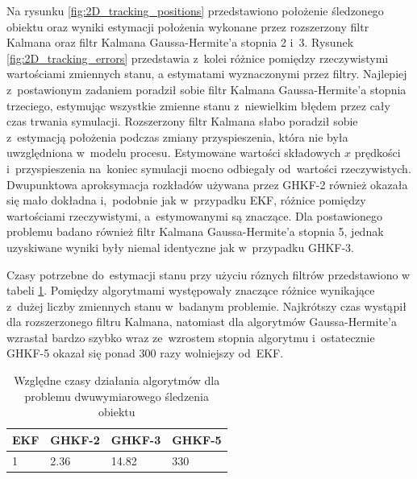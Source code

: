 Na rysunku \ref{fig:2D_tracking_positions} przedstawiono położenie śledzonego obiektu oraz wyniki estymacji położenia wykonane przez rozszerzony filtr Kalmana oraz filtr Kalmana Gaussa-Hermite'a stopnia 2 i~3. Rysunek \ref{fig:2D_tracking_errors} przedstawia z~kolei różnice pomiędzy rzeczywistymi wartościami zmiennych stanu, a estymatami wyznaczonymi przez filtry. Najlepiej z~postawionym zadaniem poradził sobie filtr Kalmana Gaussa-Hermite'a stopnia trzeciego, estymując wszystkie zmienne stanu z~niewielkim błędem przez cały czas trwania symulacji. Rozszerzony filtr Kalmana słabo poradził sobie z~estymacją położenia podczas zmiany przyspieszenia, która nie była uwzględniona w~modelu procesu. Estymowane wartości składowych $x$ prędkości i~przyspieszenia na~koniec symulacji mocno odbiegały od~wartości rzeczywistych. Dwupunktowa aproksymacja rozkładów używana przez GHKF-2 również okazała się mało dokładna i,~podobnie jak w~przypadku EKF, różnice pomiędzy wartościami rzeczywistymi, a~estymowanymi są znaczące. Dla postawionego problemu badano również filtr Kalmana Gaussa-Hermite'a stopnia 5, jednak uzyskiwane wyniki były niemal identyczne jak w~przypadku GHKF-3. \par
Czasy potrzebne do~estymacji stanu przy użyciu róznych filtrów przedstawiono w tabeli \ref{tab:2D_tracking_times}. Pomiędzy algorytmami występowały znaczące różnice wynikające z~dużej liczby zmiennych stanu w~badanym problemie. Najkrótszy czas wystąpił dla rozszerzonego filtru Kalmana, natomiast dla algorytmów Gaussa-Hermite'a wzrastał bardzo szybko wraz ze~wzrostem stopnia algorytmu i~ostatecznie GHKF-5 okazał się ponad 300 razy wolniejszy od~EKF. 
\begin{table}[]
	\caption{Względne czasy działania algorytmów dla problemu dwuwymiarowego śledzenia obiektu}
	\label{tab:2D_tracking_times}
	\begin{center}
		\begin{tabular}{|l|l|l|l|}
			\hline
			\textbf{EKF} & \textbf{GHKF-2} & \textbf{GHKF-3} & \textbf{GHKF-5} \\ 
			\hline
			1 & 2.36 & 14.82 & 330 \\
			\hline
		\end{tabular}
	\end{center}
\end{table}
